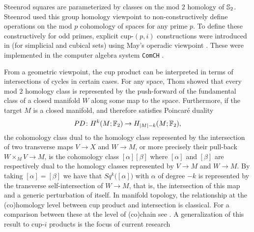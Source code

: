 \begin{remark}
	Steenrod squares are parameterized by classes on the mod $2$ homology of $\mathbb{S}_2$.
	Steenrod used this group homology viewpoint to non-constructively define operations on the mod $p$ cohomology of spaces \cite{steenrod1952reduced, steenrod1953cyclic, steenrod1962cohomology} for any prime $p$.
	To define these constructively for odd primes, explicit cup-$(p,i)$ constructions were introduced in \cite{medina2021may_st} (for simplicial and cubical sets) using May's operadic viewpoint \cite{may1970general}.
	These were implemented in the computer algebra system \texttt{ComCH} \cite{medina2021comch}.
\end{remark}

\begin{remark}
	From a geometric viewpoint, the cup product can be interpreted in terms of intersections of cycles in certain cases.
	For any space, Thom showed that every mod $2$ homology class is represented by the push-forward of the fundamental class of a closed manifold $W$ along some map to the space.
	Furthermore, if the target $M$ is a closed manifold, and therefore satisfies Poincar\'{e} duality
	\[
	PD \colon H^k(M ;{\mathbb{F}_2}) \to H_{\lvert M\rvert-k}(M; {\mathbb{F}_2}),
	\]
	the cohomology class dual to the homology class represented by the intersection of two transverse maps $V \to X$ and $W \to M$, or more precisely their pull-back $W \times_M V \to M$, is the cohomology class $[\alpha] [\beta]$ where $[\alpha]$ and $[\beta]$ are respectively dual to the homology classes represented by $V \to M$ and $W \to M$.
	By taking $[\alpha] = [\beta]$ we have that $Sq^k \big( [\alpha] \big)$ with $\alpha$ of degree $-k$ is represented by the transverse self-intersection of $W \to M$, that is, the intersection of this map and a generic perturbation of itself.
	In manifold topology, the relationship at the (co)homology level between cup product and intersection is classical.
	For a comparison between these at the level of (co)chain see \cite{medina2021flowing}.
	A generalization of this result to cup-$i$ products is the focus of current research \cite{medina2022foundations}
\end{remark}
